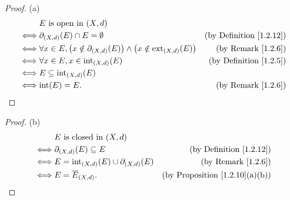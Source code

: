 \begin{proof}{(a)}
    \begin{align*}
             & E \text{ is open in } (X, d)                                                                                                                   \\
        \iff & \partial_{(X, d)}(E) \cap E = \emptyset                                                                  & \text{(by Definition \ref{1.2.12})} \\
        \iff & \forall x \in E, \big(x \notin \partial_{(X, d)}(E)\big) \land \big(x \notin \text{ext}_{(X, d)}(E)\big) & \text{(by Remark \ref{1.2.6})}      \\
        \iff & \forall x \in E, x \in \text{int}_{(X, d)}(E)                                                            & \text{(by Definition \ref{1.2.5})}  \\
        \iff & E \subseteq \text{int}_{(X, d)}(E)                                                                                                             \\
        \iff & \text{int}(E) = E.                                                                                       & \text{(by Remark \ref{1.2.6})}
    \end{align*}
\end{proof}

\begin{proof}{(b)}
    \begin{align*}
             & E \text{ is closed in } (X, d)                                                                    \\
        \iff & \partial_{(X, d)}(E) \subseteq E                     & \text{(by Definition \ref{1.2.12})}        \\
        \iff & E = \text{int}_{(X, d)}(E) \cup \partial_{(X, d)}(E) & \text{(by Remark \ref{1.2.6})}             \\
        \iff & E = \overline{E}_{(X, d)}.                           & \text{(by Proposition \ref{1.2.10}(a)(b))}
    \end{align*}
\end{proof}

